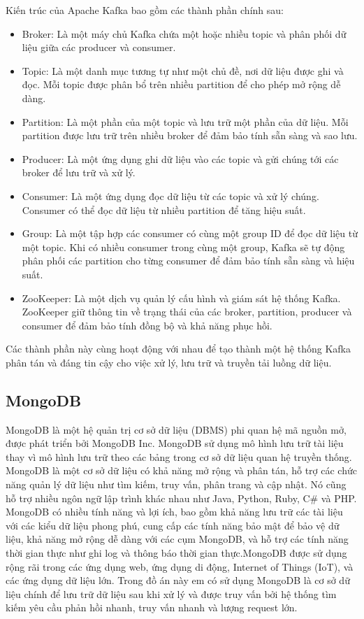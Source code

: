 \documentclass[../DoAn.tex]{subfiles}
\begin{document}
Kiến trúc của Apache Kafka bao gồm các thành phần chính sau:
\begin{itemize}
    \item Broker: Là một máy chủ Kafka chứa một hoặc nhiều topic và phân phối dữ liệu giữa các producer và consumer.
    \item Topic: Là một danh mục tương tự như một chủ đề, nơi dữ liệu được ghi và đọc. Mỗi topic được phân bổ trên nhiều partition để cho phép mở rộng dễ dàng.
    \item Partition: Là một phần của một topic và lưu trữ một phần của dữ liệu. Mỗi partition được lưu trữ trên nhiều broker để đảm bảo tính sẵn sàng và sao lưu.
    \item Producer: Là một ứng dụng ghi dữ liệu vào các topic và gửi chúng tới các broker để lưu trữ và xử lý.
    \item Consumer: Là một ứng dụng đọc dữ liệu từ các topic và xử lý chúng. Consumer có thể đọc dữ liệu từ nhiều partition để tăng hiệu suất.
    \item Group: Là một tập hợp các consumer có cùng một group ID để đọc dữ liệu từ một topic. Khi có nhiều consumer trong cùng một group, Kafka sẽ tự động phân phối các partition cho từng consumer để đảm bảo tính sẵn sàng và hiệu suất.
    \item ZooKeeper: Là một dịch vụ quản lý cấu hình và giám sát hệ thống Kafka. ZooKeeper giữ thông tin về trạng thái của các broker, partition, producer và consumer để đảm bảo tính đồng bộ và khả năng phục hồi.
\end{itemize}

Các thành phần này cùng hoạt động với nhau để tạo thành một hệ thống Kafka phân tán và đáng tin cậy cho việc xử lý, lưu trữ và truyền tải luồng dữ liệu.

\subsection{MongoDB}
\label{subsection:3.2.1}
MongoDB là một hệ quản trị cơ sở dữ liệu (DBMS) phi quan hệ mã nguồn mở, được phát triển bởi MongoDB Inc. MongoDB sử dụng mô hình lưu trữ tài liệu thay vì mô hình lưu trữ theo các bảng trong cơ sở dữ liệu quan hệ truyền thống. MongoDB là một cơ sở dữ liệu có khả năng mở rộng và phân tán, hỗ trợ các chức năng quản lý dữ liệu như tìm kiếm, truy vấn, phân trang và cập nhật. Nó cũng hỗ trợ nhiều ngôn ngữ lập trình khác nhau như Java, Python, Ruby, C# và PHP.
MongoDB có nhiều tính năng và lợi ích, bao gồm khả năng lưu trữ các tài liệu với các kiểu dữ liệu phong phú, cung cấp các tính năng bảo mật để bảo vệ dữ liệu, khả năng mở rộng dễ dàng với các cụm MongoDB, và hỗ trợ các tính năng thời gian thực như ghi log và thông báo thời gian thực.MongoDB được sử dụng rộng rãi trong các ứng dụng web, ứng dụng di động, Internet of Things (IoT), và các ứng dụng dữ liệu lớn. Trong đồ án này em có sử dụng MongoDB là cơ sở dữ liệu chính để lưu trữ dữ liệu sau khi xử lý và được truy vấn bởi hệ thống tìm kiếm yêu cầu phản hồi nhanh, truy vấn nhanh và lượng request lớn. 
\end{document}
